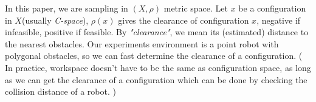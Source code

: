 \documentclass[11pt]{article}
\begin{document}

\indent In this paper, we are sampling in $(X, \rho)$ metric space. Let $x$ be a configuration in $X$(usually \emph{C-space}), $\rho(x)$ gives the clearance of configuration $x$, negative if infeasible, positive if feasible. By \emph{"clearance"}, we mean its (estimated) distance to the nearest obstacles. Our experiments environment is a point robot with polygonal obstacles, so we can fast determine the clearance of a configuration. ( In practice, workspace doesn't have to be the same as configuration space, as long as we can get the clearance of a configuration which can be done by checking the collision distance of a robot. )   




\end{document}
